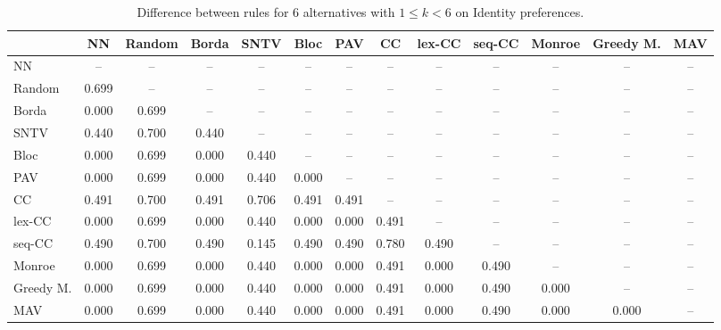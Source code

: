 
\begin{table*}[htbp]
\centering
\begin{tabular}{lcccccccccccc}
\toprule
 & NN & Random & Borda & SNTV & Bloc & PAV & CC & lex-CC & seq-CC & Monroe & Greedy M. & MAV \\
\midrule
NN & -- & -- & -- & -- & -- & -- & -- & -- & -- & -- & -- & -- \\
Random & \cellcolor{blue!69} 0.699 & -- & -- & -- & -- & -- & -- & -- & -- & -- & -- & -- \\
Borda & \cellcolor{blue!0} 0.000 & \cellcolor{blue!69} 0.699 & -- & -- & -- & -- & -- & -- & -- & -- & -- & -- \\
SNTV & \cellcolor{blue!44} 0.440 & \cellcolor{blue!70} 0.700 & \cellcolor{blue!44} 0.440 & -- & -- & -- & -- & -- & -- & -- & -- & -- \\
Bloc & \cellcolor{blue!0} 0.000 & \cellcolor{blue!69} 0.699 & \cellcolor{blue!0} 0.000 & \cellcolor{blue!44} 0.440 & -- & -- & -- & -- & -- & -- & -- & -- \\
PAV & \cellcolor{blue!0} 0.000 & \cellcolor{blue!69} 0.699 & \cellcolor{blue!0} 0.000 & \cellcolor{blue!44} 0.440 & \cellcolor{blue!0} 0.000 & -- & -- & -- & -- & -- & -- & -- \\
CC & \cellcolor{blue!49} 0.491 & \cellcolor{blue!70} 0.700 & \cellcolor{blue!49} 0.491 & \cellcolor{blue!70} 0.706 & \cellcolor{blue!49} 0.491 & \cellcolor{blue!49} 0.491 & -- & -- & -- & -- & -- & -- \\
lex-CC & \cellcolor{blue!0} 0.000 & \cellcolor{blue!69} 0.699 & \cellcolor{blue!0} 0.000 & \cellcolor{blue!44} 0.440 & \cellcolor{blue!0} 0.000 & \cellcolor{blue!0} 0.000 & \cellcolor{blue!49} 0.491 & -- & -- & -- & -- & -- \\
seq-CC & \cellcolor{blue!49} 0.490 & \cellcolor{blue!70} 0.700 & \cellcolor{blue!49} 0.490 & \cellcolor{blue!14} 0.145 & \cellcolor{blue!49} 0.490 & \cellcolor{blue!49} 0.490 & \cellcolor{blue!78} 0.780 & \cellcolor{blue!49} 0.490 & -- & -- & -- & -- \\
Monroe & \cellcolor{blue!0} 0.000 & \cellcolor{blue!69} 0.699 & \cellcolor{blue!0} 0.000 & \cellcolor{blue!44} 0.440 & \cellcolor{blue!0} 0.000 & \cellcolor{blue!0} 0.000 & \cellcolor{blue!49} 0.491 & \cellcolor{blue!0} 0.000 & \cellcolor{blue!49} 0.490 & -- & -- & -- \\
Greedy M. & \cellcolor{blue!0} 0.000 & \cellcolor{blue!69} 0.699 & \cellcolor{blue!0} 0.000 & \cellcolor{blue!44} 0.440 & \cellcolor{blue!0} 0.000 & \cellcolor{blue!0} 0.000 & \cellcolor{blue!49} 0.491 & \cellcolor{blue!0} 0.000 & \cellcolor{blue!49} 0.490 & \cellcolor{blue!0} 0.000 & -- & -- \\
MAV & \cellcolor{blue!0} 0.000 & \cellcolor{blue!69} 0.699 & \cellcolor{blue!0} 0.000 & \cellcolor{blue!44} 0.440 & \cellcolor{blue!0} 0.000 & \cellcolor{blue!0} 0.000 & \cellcolor{blue!49} 0.491 & \cellcolor{blue!0} 0.000 & \cellcolor{blue!49} 0.490 & \cellcolor{blue!0} 0.000 & \cellcolor{blue!0} 0.000 & -- \\
\bottomrule
\end{tabular}

\caption{Difference between rules for 6 alternatives with $1 \leq k < 6$ on Identity preferences.}
\label{tab:rule_distance_heatmap-m=[6]-pref_dist=identity}
\end{table*}
    